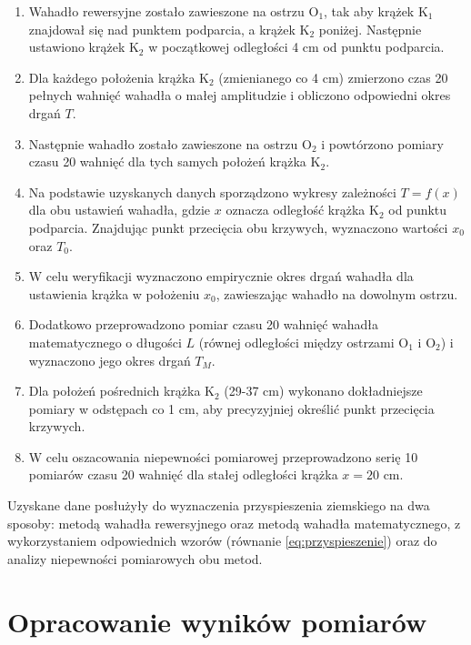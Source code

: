 \documentclass[a4paper,12pt]{article}
\begin{document}
\begin{enumerate}
    \item Wahadło rewersyjne zostało zawieszone na ostrzu O$_1$, tak aby krążek K$_1$ znajdował się nad punktem podparcia, a krążek K$_2$ poniżej. Następnie ustawiono krążek K$_2$ w początkowej odległości 4 cm od punktu podparcia.
    
    \item Dla każdego położenia krążka K$_2$ (zmienianego co 4 cm) zmierzono czas 20 pełnych wahnięć wahadła o małej amplitudzie i obliczono odpowiedni okres drgań $T$.
    
    \item Następnie wahadło zostało zawieszone na ostrzu O$_2$ i powtórzono pomiary czasu 20 wahnięć dla tych samych położeń krążka K$_2$.
    
    \item Na podstawie uzyskanych danych sporządzono wykresy zależności $T=f(x)$ dla obu ustawień wahadła, gdzie $x$ oznacza odległość krążka K$_2$ od punktu podparcia. Znajdując punkt przecięcia obu krzywych, wyznaczono wartości $x_0$ oraz $T_0$.
    
    \item W celu weryfikacji wyznaczono empirycznie okres drgań wahadła dla ustawienia krążka w położeniu $x_0$, zawieszając wahadło na dowolnym ostrzu.
    
    \item Dodatkowo przeprowadzono pomiar czasu 20 wahnięć wahadła matematycznego o długości $L$ (równej odległości między ostrzami O$_1$ i O$_2$) i wyznaczono jego okres drgań $T_M$.
    
    \item Dla położeń pośrednich krążka K$_2$ (29-37 cm) wykonano dokładniejsze pomiary w odstępach co 1 cm, aby precyzyjniej określić punkt przecięcia krzywych.
    
    \item W celu oszacowania niepewności pomiarowej przeprowadzono serię 10 pomiarów czasu 20 wahnięć dla stałej odległości krążka $x=20$ cm.
\end{enumerate}

Uzyskane dane posłużyły do wyznaczenia przyspieszenia ziemskiego na dwa sposoby: metodą wahadła rewersyjnego oraz metodą wahadła matematycznego, z wykorzystaniem odpowiednich wzorów (równanie \ref{eq:przyspieszenie}) oraz do analizy niepewności pomiarowych obu metod.

\section{Opracowanie wyników pomiarów}
\end{document}

